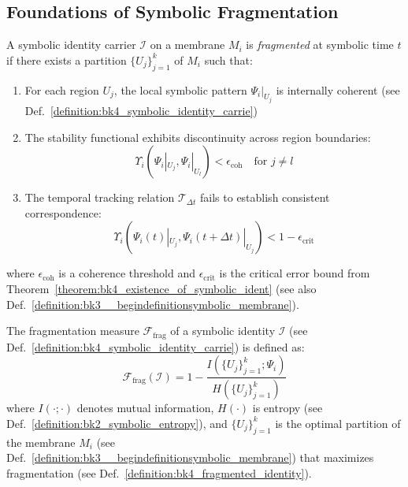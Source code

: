 \subsection{Foundations of Symbolic Fragmentation} \label{subsec:bk4_foundations_symbolic_fragmentation}
\begin{definition} \label{definition:bk4_fragmented_identity}
A symbolic identity carrier $\mathcal{I}$ on a membrane $M_i$ is \textit{fragmented} at symbolic time $t$ if there exists a partition $\{U_j\}_{j=1}^k$ of $M_i$ such that:
\begin{enumerate}
    \item For each region $U_j$, the local symbolic pattern $\Psi_i|_{U_j}$ is internally coherent (see Def.~\ref{definition:bk4_symbolic_identity_carrie})
    \item The stability functional exhibits discontinuity across region boundaries:
    \begin{equation}
        \Upsilon_i(\Psi_i|_{U_j}, \Psi_i|_{U_l}) < \epsilon_{\text{coh}} \quad \text{for } j \neq l
    \end{equation}
    \item The temporal tracking relation $\mathcal{T}_{\Delta t}$ fails to establish consistent correspondence:
    \begin{equation}
        \Upsilon_i(\Psi_i(t)|_{U_j}, \Psi_i(t+\Delta t)|_{U_j}) < 1 - \epsilon_{\text{crit}}
    \end{equation}
\end{enumerate}
where $\epsilon_{\text{coh}}$ is a coherence threshold and $\epsilon_{\text{crit}}$ is the critical error bound from Theorem~\ref{theorem:bk4_existence_of_symbolic_ident} (see also Def.~\ref{definition:bk3__begindefinitionsymbolic_membrane}).
\end{definition}
\begin{definition} \label{definition:bk4_fragmentation_measure}
The fragmentation measure $\mathcal{F}_{\text{frag}}$ of a symbolic identity $\mathcal{I}$ (see Def.~\ref{definition:bk4_symbolic_identity_carrie}) is defined as:
\begin{equation}
    \mathcal{F}_{\text{frag}}(\mathcal{I}) = 1 - \frac{I(\{U_j\}_{j=1}^k; \Psi_i)}{H(\{U_j\}_{j=1}^k)}
\end{equation}
where $I(\cdot;\cdot)$ denotes mutual information, $H(\cdot)$ is entropy (see Def.~\ref{definition:bk2_symbolic_entropy}), and $\{U_j\}_{j=1}^k$ is the optimal partition of the membrane $M_i$ (see Def.~\ref{definition:bk3__begindefinitionsymbolic_membrane}) that maximizes fragmentation (see Def.~\ref{definition:bk4_fragmented_identity}).
\end{definition}
